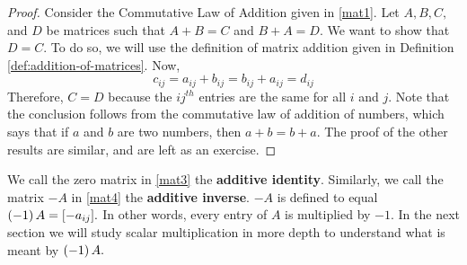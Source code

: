 \begin{proof}
Consider the Commutative Law of Addition given in \ref{mat1}. Let $A,B,C,$ and $D$ be matrices such that $A+B=C$ and 
$B+A=D.$ We want to show that $D=C$. To do so, we will use the definition of matrix addition given in Definition \ref{def:addition-of-matrices}.
Now,
\begin{equation*}
c_{ij}=a_{ij}+b_{ij}=b_{ij}+a_{ij}=d_{ij}
\end{equation*}
Therefore, $C=D$ because the $ij^{th}$ entries are the same for all $i$ and $j$. Note that the
conclusion follows from the commutative law of addition of numbers, which says that if $a$ and $b$ are two numbers,
then $a+b = b+a$. 
The proof of the other results are similar, and are left as an exercise.
\end{proof}

We call the zero matrix in \ref{mat3} the \textbf{additive identity}. Similarly, we call the matrix $-A$
in \ref{mat4} the \textbf{additive inverse}. $-A$ is 
defined to equal $\left(-1\right) A = [-a_{ij}].$ In other words, every entry of $A$ is multiplied by $-1$.
In the next section we will study scalar multiplication in more depth 
to understand what is meant by  $\left(-1\right) A.$
